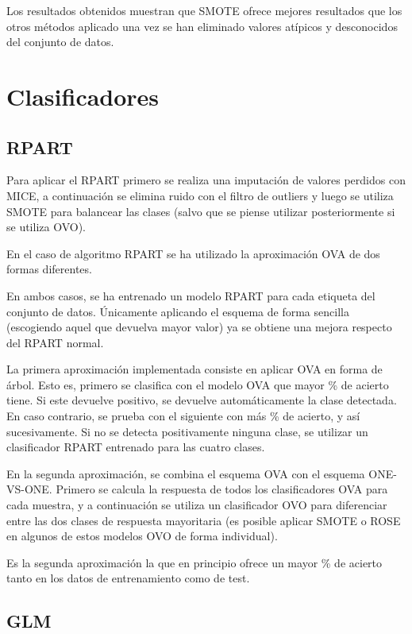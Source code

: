 \documentclass[]{scrartcl}
\begin{document}
Los resultados obtenidos muestran que SMOTE ofrece mejores resultados que los otros métodos aplicado una vez se han eliminado valores atípicos y desconocidos del conjunto de datos. 

\section{Clasificadores}

\subsection{RPART}
Para aplicar el RPART primero se realiza una imputación de valores perdidos con MICE, a continuación se elimina ruido con el filtro de outliers y luego se utiliza SMOTE para balancear las clases (salvo que se piense utilizar posteriormente si se utiliza OVO).


En el caso de algoritmo RPART se ha utilizado la aproximación OVA de dos formas diferentes.

En ambos casos, se ha entrenado un modelo RPART para cada etiqueta del conjunto de datos. Únicamente aplicando el esquema de forma sencilla (escogiendo aquel que devuelva mayor valor) ya se obtiene una mejora respecto del RPART normal.

La primera aproximación implementada consiste en aplicar OVA en forma de árbol. Esto es, primero se clasifica con el modelo OVA que mayor \% de acierto tiene. Si este devuelve positivo, se devuelve automáticamente la clase detectada. En caso contrario, se prueba con el siguiente con más \% de acierto, y así sucesivamente. Si no se detecta positivamente ninguna clase, se utilizar un clasificador RPART entrenado para las cuatro clases.

En la segunda aproximación, se combina el esquema OVA con el esquema ONE-VS-ONE. Primero se calcula la respuesta de todos los clasificadores OVA para cada muestra, y a continuación se utiliza un clasificador OVO para diferenciar entre las dos clases de respuesta mayoritaria (es posible aplicar SMOTE o ROSE en algunos de estos modelos OVO de forma individual).

Es la segunda aproximación la que en principio ofrece un mayor \% de acierto tanto en los datos de entrenamiento como de test.

\subsection{GLM}
\end{document}
